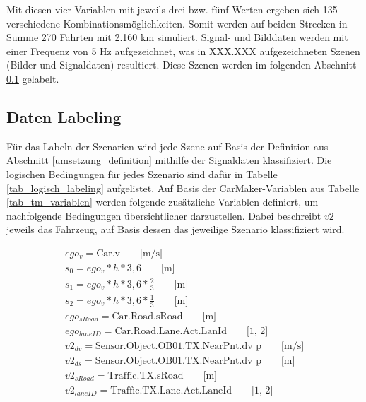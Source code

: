 Mit diesen vier Variablen mit jeweils drei bzw. fünf Werten ergeben sich 135 verschiedene Kombinationsmöglichkeiten. Somit werden auf beiden Strecken in Summe 270 Fahrten mit 2.160 km simuliert. Signal- und Bilddaten werden mit einer Frequenz von 5 Hz aufgezeichnet, was in XXX.XXX  aufgezeichneten Szenen (Bilder und Signaldaten) resultiert. Diese Szenen werden im folgenden Abschnitt \ref{umsetzung_daten_synth_labeling} gelabelt.


\subsection{Daten Labeling}
\label{umsetzung_daten_synth_labeling}

Für das Labeln der Szenarien wird jede Szene auf Basis der Definition aus Abschnitt \ref{umsetzung_definition} mithilfe der Signaldaten klassifiziert. Die logischen Bedingungen für jedes Szenario sind dafür in Tabelle \ref{tab_logisch_labeling} aufgelistet. Auf Basis der CarMaker-Variablen aus Tabelle \ref{tab_tm_variablen} werden folgende zusätzliche Variablen definiert, um nachfolgende Bedingungen übersichtlicher darzustellen. Dabei beschreibt $v2$ jeweils das Fahrzeug, auf Basis dessen das jeweilige Szenario klassifiziert wird.

\begin{equation*}
\begin{split}
ego_v = \text{Car.v} \qquad \text{[m/s]} \\
s_0 = ego_v * h * 3,6 \qquad \text{[m]} \\
s_1 = ego_v * h * 3,6 * \frac{2}{3} \qquad \text{[m]} \\
s_2 = ego_v * h * 3,6 * \frac{1}{3} \qquad \text{[m]} \\
ego_{sRoad} = \text{Car.Road.sRoad} \qquad \text{[m]} \\
ego_{laneID} = \text{Car.Road.Lane.Act.LanId} \qquad \text{[1, 2]} \\
v2_{dv} = \text{Sensor.Object.OB01.TX.NearPnt.dv\_p} \qquad \text{[m/s]} \\
v2_{ds} = \text{Sensor.Object.OB01.TX.NearPnt.dv\_p} \qquad \text{[m]} \\
v2_{sRoad} = \text{Traffic.TX.sRoad} \qquad \text{[m]} \\
v2_{laneID} = \text{Traffic.TX.Lane.Act.LaneId} \qquad \text{[1, 2]} \\
\end{split}
\end{equation*}

